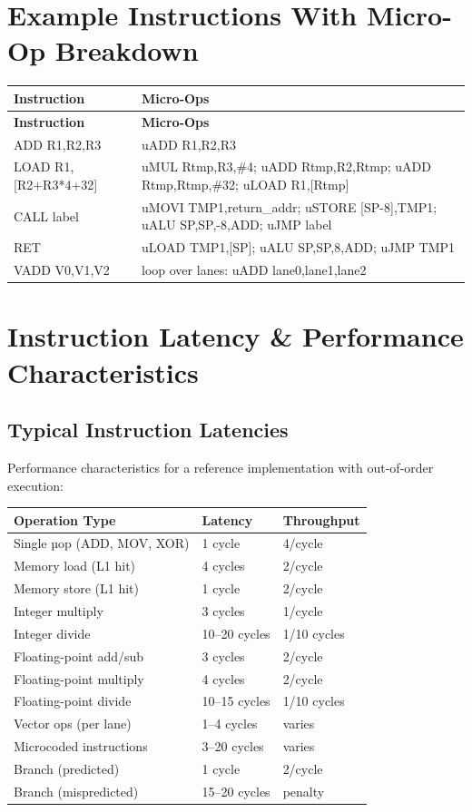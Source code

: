 \documentclass[12pt]{article}
\begin{document}
\section{Example Instructions With Micro-Op Breakdown}

\begin{longtable}{@{}L{2.8cm}L{7cm}@{}}
\toprule
\textbf{Instruction} & \textbf{Micro-Ops} \\ \midrule
\endfirsthead
\toprule
\textbf{Instruction} & \textbf{Micro-Ops} \\ \midrule
\endhead
ADD R1,R2,R3 & uADD R1,R2,R3 \\
LOAD R1,[R2+R3*4+32] & uMUL Rtmp,R3,\#4; uADD Rtmp,R2,Rtmp; uADD Rtmp,Rtmp,\#32; uLOAD R1,[Rtmp] \\
CALL label & uMOVI TMP1,return\_addr; uSTORE [SP-8],TMP1; uALU SP,SP,-8,ADD; uJMP label \\
RET & uLOAD TMP1,[SP]; uALU SP,SP,8,ADD; uJMP TMP1 \\
VADD V0,V1,V2 & loop over lanes: uADD lane0,lane1,lane2 \\ \bottomrule
\end{longtable}

\section{Instruction Latency \& Performance Characteristics}

\subsection{Typical Instruction Latencies}

Performance characteristics for a reference implementation with out-of-order execution:

\begin{table}[h]
\centering
\begin{tabular}{@{}lll@{}}
\toprule
\textbf{Operation Type} & \textbf{Latency} & \textbf{Throughput} \\ \midrule
Single µop (ADD, MOV, XOR) & 1 cycle & 4/cycle \\
Memory load (L1 hit) & 4 cycles & 2/cycle \\
Memory store (L1 hit) & 1 cycle & 2/cycle \\
Integer multiply & 3 cycles & 1/cycle \\
Integer divide & 10--20 cycles & 1/10 cycles \\
Floating-point add/sub & 3 cycles & 2/cycle \\
Floating-point multiply & 4 cycles & 2/cycle \\
Floating-point divide & 10--15 cycles & 1/10 cycles \\
Vector ops (per lane) & 1--4 cycles & varies \\
Microcoded instructions & 3--20 cycles & varies \\
Branch (predicted) & 1 cycle & 2/cycle \\
Branch (mispredicted) & 15--20 cycles & penalty \\ \bottomrule
\end{tabular}
\end{table}
\end{document}
